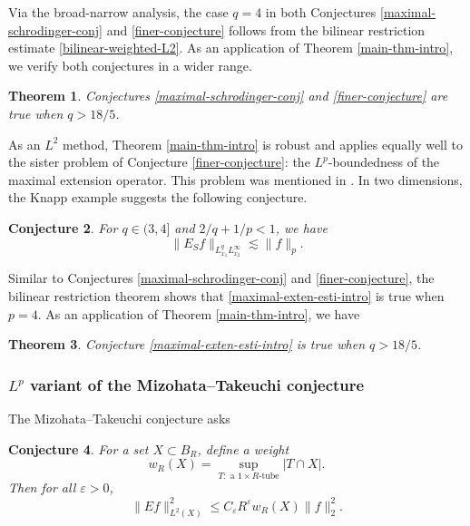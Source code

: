 \documentclass{amsart}
\numberwithin{equation}{section}
\newtheorem{theorem}{Theorem}[section]
\newtheorem{conjecture}[theorem]{Conjecture}
\newcommand{\e}{\varepsilon}
\begin{document}
Via the broad-narrow analysis, the case $q=4$ in both Conjectures \ref{maximal-schrodinger-conj} and \ref{finer-conjecture} follows from the bilinear restriction estimate \eqref{bilinear-weighted-L2}.
As an application of Theorem \ref{main-thm-intro}, we verify both conjectures in a wider range.

\begin{theorem}
\label{maximal-schrodinger-thm}
Conjectures \ref{maximal-schrodinger-conj} and \ref{finer-conjecture} are true when $q>18/5$.
\end{theorem}

\medskip

As an $L^2$ method, Theorem \ref{main-thm-intro} is robust and applies equally well to the sister problem of Conjecture \ref{finer-conjecture}: the $L^p$-boundedness of the maximal extension operator.
This problem was mentioned in \cite[(1.17)]{Wu-refined-Strichartz}.
In two dimensions, the Knapp example suggests the following conjecture.
\begin{conjecture}
\label{maximal-extension-conj}
For $q\in(3,4]$ and $2/q+1/p<1$, we have
\begin{equation}
\label{maximal-exten-esti-intro}
    \|E_Sf\|_{L^q_{x_1}L^\infty_{x_2}}\lesssim\|f\|_p.
\end{equation}
\end{conjecture}

Similar to Conjectures \ref{maximal-schrodinger-conj} and \ref{finer-conjecture}, the bilinear restriction theorem shows that \eqref{maximal-exten-esti-intro} is true when $p=4$.
As an application of Theorem \ref{main-thm-intro}, we have

\begin{theorem}
\label{maximal-exten-thm-intro}
Conjecture \ref{maximal-exten-esti-intro} is true when $q>18/5$.
\end{theorem}


\medskip


\subsubsection{\texorpdfstring{$L^p$}{} variant of the Mizohata–Takeuchi conjecture}

The Mizohata–Takeuchi conjecture asks

\begin{conjecture}
\label{MT-conj}
For a set $X\subset B_R$, define a weight 
\begin{equation}
\label{weight}
    w_R(X)=\sup_{T:\text{ a $1\times R$-tube}}|T\cap X|.
\end{equation}
Then for all $\e>0$,
\begin{equation}
\label{MT-L2}
    \|Ef\|_{L^2(X)}^2\leq C_\e R^\e w_R(X)\|f\|_2^2.
\end{equation}
\end{conjecture}
\end{document}
